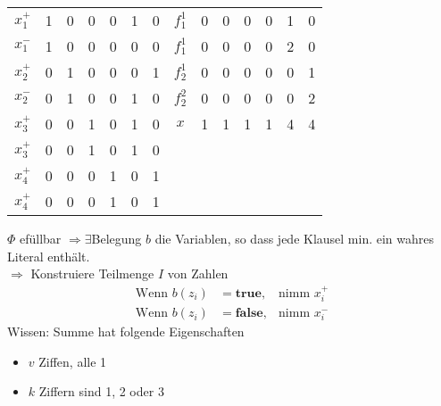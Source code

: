  \begin{center}
  \begin{tabular}{ccccccc|ccccccc}
   $x_1^+$ & 1 & 0 & 0 & 0 & 1 & 0 & $f_1^1$ & 0 & 0 & 0 & 0 & 1 & 0 \\
   $x_1^-$ & 1 & 0 & 0 & 0 & 0 & 0 & $f_1^1$ & 0 & 0 & 0 & 0 & 2 & 0 \\
   $x_2^+$ & 0 & 1 & 0 & 0 & 0 & 1 & $f_2^1$ & 0 & 0 & 0 & 0 & 0 & 1 \\
   $x_2^-$ & 0 & 1 & 0 & 0 & 1 & 0 & $f_2^2$ & 0 & 0 & 0 & 0 & 0 & 2 \\
   $x_3^+$ & 0 & 0 & 1 & 0 & 1 & 0 & $x$     & 1 & 1 & 1 & 1 & 4 & 4 \\
   $x_3^+$ & 0 & 0 & 1 & 0 & 1 & 0 & \\
   $x_4^+$ & 0 & 0 & 0 & 1 & 0 & 1 & \\
   $x_4^+$ & 0 & 0 & 0 & 1 & 0 & 1 & 
  \end{tabular}
 \end{center}

 $\Phi$ efüllbar $\Rightarrow \exists$Belegung $b$ die Variablen, so dass jede Klausel min. ein wahres Literal enthält.\\
 $\Rightarrow$ Konstruiere Teilmenge $I$ von Zahlen
 \begin{align*}
  \text{Wenn } b(z_i) &= \textbf{true}, &\text{nimm $x_i^+$} \\
  \text{Wenn } b(z_i) &= \textbf{false}, &\text{nimm $x_i^-$}
 \end{align*}
 Wissen: Summe hat folgende Eigenschaften
 \begin{itemize}
  \item $v$ Ziffen, alle 1
  \item $k$ Ziffern sind 1, 2 oder 3
 \end{itemize}
 
